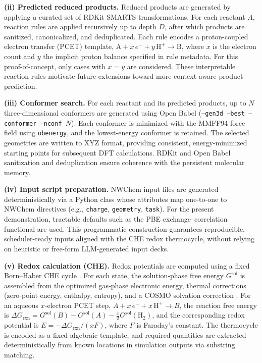 \textbf{(ii) Predicted reduced products.}
Reduced products are generated by applying a curated set of RDKit SMARTS transformations. For each reactant $A$, reaction rules are applied recursively up to depth $D$, after which products are sanitized, canonicalized, and deduplicated. Each rule encodes a proton-coupled electron transfer (PCET) template,
$\mathrm{A} + x\,e^- + y\,\mathrm{H}^+ \rightarrow \mathrm{B}$,
where $x$ is the electron count and $y$ the implicit proton balance specified in rule metadata. For this proof-of-concept, only cases with $x=y$ are considered. These interpretable reaction rules motivate future extensions toward more context-aware product prediction.

\textbf{(iii) Conformer search.}
For each reactant and its predicted products, up to $N$ three-dimensional conformers are generated using Open Babel (\texttt{--gen3d --best --conformer --nconf $N$}). Each conformer is minimized with the MMFF94 force field using \texttt{obenergy}, and the lowest-energy conformer is retained. The selected geometries are written to XYZ format, providing consistent, energy-minimized starting points for subsequent DFT calculations. RDKit and Open Babel sanitization and deduplication ensure coherence with the persistent molecular memory.

\textbf{(iv) Input script preparation.}
NWChem input files are generated deterministically via a Python class whose attributes map one-to-one to NWChem directives (e.g., \texttt{charge}, \texttt{geometry}, \texttt{task}). For the present demonstration, tractable defaults such as the PBE exchange–correlation functional are used. This programmatic construction guarantees reproducible, scheduler-ready inputs aligned with the CHE redox thermocycle, without relying on heuristic or free-form LLM-generated input decks.

\textbf{(v) Redox calculation (CHE).}
Redox potentials are computed using a fixed Born–Haber CHE cycle \cite{singh2025sulfonated}. For each state, the solution-phase free energy $G^{\mathrm{sol}}$ is assembled from the optimized gas-phase electronic energy, thermal corrections (zero-point energy, enthalpy, entropy), and a COSMO solvation correction \cite{klamt2011cosmo}. For an aqueous $x$-electron PCET step,
$A + x\,e^- + x\,\mathrm{H}^+ \rightarrow B$,
the reaction free energy is
$\Delta G_{\mathrm{rxn}} = G^{\mathrm{sol}}(B) - G^{\mathrm{sol}}(A) - \tfrac{x}{2} G^{\mathrm{sol}}(\mathrm{H_2})$,
and the corresponding redox potential is
$E = -\Delta G_{\mathrm{rxn}}/(xF)$,
where $F$ is Faraday’s constant. The thermocycle is encoded as a fixed algebraic template, and required quantities are extracted deterministically from known locations in simulation outputs via substring matching.

